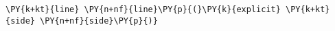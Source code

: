 \begin{Verbatim}[commandchars=\\\{\}]
    \PY{k+kt}{line} \PY{n+nf}{line}\PY{p}{(}\PY{k}{explicit} \PY{k+kt}{side} \PY{n+nf}{side}\PY{p}{)}
\end{Verbatim}

